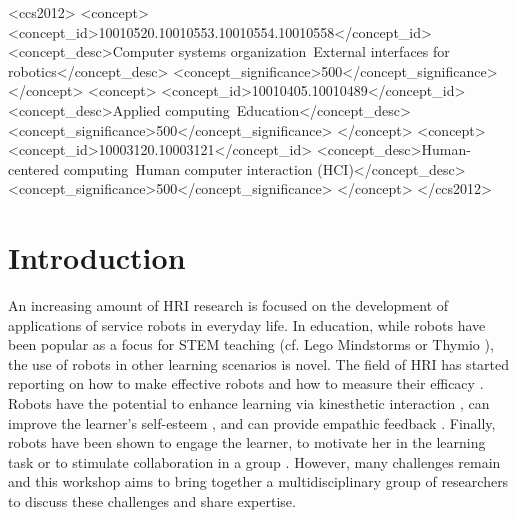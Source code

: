 \documentclass{sig-alternate-05-2015}
\newcommand{\comments}[1]{\todo[inline,linecolor=blue,backgroundcolor=blue!15,bordercolor=blue]{#1}}
\begin{document}
%
%
\begin{CCSXML}
	<ccs2012>
	<concept>
	<concept_id>10010520.10010553.10010554.10010558</concept_id>
	<concept_desc>Computer systems organization~External interfaces for robotics</concept_desc>
	<concept_significance>500</concept_significance>
	</concept>
	<concept>
	<concept_id>10010405.10010489</concept_id>
	<concept_desc>Applied computing~Education</concept_desc>
	<concept_significance>500</concept_significance>
	</concept>
	<concept>
	<concept_id>10003120.10003121</concept_id>
	<concept_desc>Human-centered computing~Human computer interaction (HCI)</concept_desc>
	<concept_significance>500</concept_significance>
	</concept>
	</ccs2012>
\end{CCSXML}


%
%

%
%


\section{Introduction}
An increasing amount of HRI research is focused on the development of applications of service robots in everyday life. 
In education, while robots have been popular as a focus for STEM 
teaching (cf. Lego Mindstorms or Thymio \cite{riedo2012two}), the use of robots in other learning scenarios is novel. The field of HRI has started reporting on how to make 
effective robots and how to measure their efficacy 
\cite{kennedy2016social,tanaka2015pepper}. Robots have the 
potential to enhance learning via kinesthetic interaction \cite{lemaignan2016,tanaka2012children}, can improve 
the learner's self-esteem \cite{lemaignan2016}, and can provide empathic feedback 
\cite{castellano2013towards}. Finally, robots have been shown to engage the 
learner, to motivate her in the learning task or to stimulate collaboration in a 
group \cite{}. However, many challenges remain and this workshop aims to bring 
together a multidisciplinary group of researchers to discuss these challenges 
and share expertise.
\end{document}
